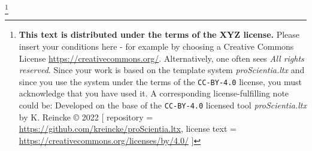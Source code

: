 

\footnote{\textbf{This text is distributed under the terms of the XYZ license.} Please insert your conditions here - for example by choosing a Creative Commons License \href{https://creativecommons.org/}{https://creativecommons.org/}. Alternatively, one often sees \emph{All rights reserved}. \newline
Since your work is based on the template system \textit{proScientia.ltx} and since you use the system under the terms of the \texttt{CC-BY-4.0} license, you must acknowledge that you have used it. A corresponding license-fulfilling note could be:\newline
Developed on the base of the \texttt{CC-BY-4.0} licensed tool \textit{proScientia.ltx} by K. Reincke \copyright{} 2022 [
repository = \href{https://github.com/kreincke/proScientia.ltx}{https://github.com/kreincke/proScientia.ltx},
license text = \href{https://creativecommons.org/licenses/by/4.0/}{https://creativecommons.org/licenses/by/4.0/} ]
}
